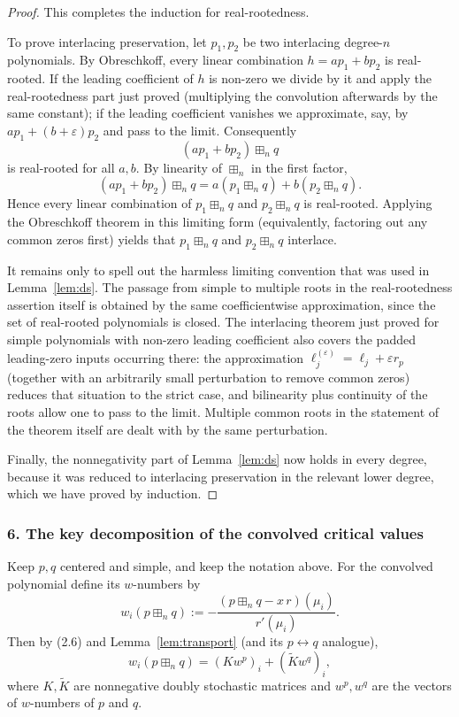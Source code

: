 \documentclass{article}
\begin{document}
\begin{proof}
This completes the induction for real-rootedness.

To prove interlacing preservation, let $p_1, p_2$ be two interlacing degree-$n$ polynomials. By Obreschkoff, every linear combination $h = ap_1 + bp_2$ is real-rooted. If the leading coefficient of $h$ is non-zero we divide by it and apply the real-rootedness part just proved (multiplying the convolution afterwards by the same constant); if the leading coefficient vanishes we approximate, say, by $ap_1 + (b+\varepsilon)p_2$ and pass to the limit. Consequently
\[
  (ap_1 + bp_2) \boxplus_n q
\]
is real-rooted for all $a, b$. By linearity of $\boxplus_n$ in the first factor,
\[
  (ap_1 + bp_2) \boxplus_n q = a(p_1 \boxplus_n q) + b(p_2 \boxplus_n q).
\]
Hence every linear combination of $p_1 \boxplus_n q$ and $p_2 \boxplus_n q$ is real-rooted. Applying the Obreschkoff theorem in this limiting form (equivalently, factoring out any common zeros first) yields that $p_1 \boxplus_n q$ and $p_2 \boxplus_n q$ interlace.

It remains only to spell out the harmless limiting convention that was used in Lemma~\ref{lem:ds}. The passage from simple to multiple roots in the real-rootedness assertion itself is obtained by the same coefficientwise approximation, since the set of real-rooted polynomials is closed. The interlacing theorem just proved for simple polynomials with non-zero leading coefficient also covers the padded leading-zero inputs occurring there: the approximation $\ell_j^{(\varepsilon)} = \ell_j + \varepsilon r_p$ (together with an arbitrarily small perturbation to remove common zeros) reduces that situation to the strict case, and bilinearity plus continuity of the roots allow one to pass to the limit. Multiple common roots in the statement of the theorem itself are dealt with by the same perturbation.

Finally, the nonnegativity part of Lemma~\ref{lem:ds} now holds in every degree, because it was reduced to interlacing preservation in the relevant lower degree, which we have proved by induction.
\end{proof}

\subsubsection*{6. The key decomposition of the convolved critical values}

Keep $p, q$ centered and simple, and keep the notation above. For the convolved polynomial define its $w$-numbers by
\begin{equation}
  w_i(p \boxplus_n q) := -\frac{(p \boxplus_n q - x\,r)(\mu_i)}{r'(\mu_i)}. \tag{2.20}
\end{equation}
Then by (2.6) and Lemma~\ref{lem:transport} (and its $p \leftrightarrow q$ analogue),
\begin{equation}
  w_i(p \boxplus_n q) = (K w^p)_i + (\widetilde{K} w^q)_i, \tag{2.21}
\end{equation}
where $K, \widetilde{K}$ are nonnegative doubly stochastic matrices and $w^p, w^q$ are the vectors of $w$-numbers of $p$ and $q$.
\end{document}
